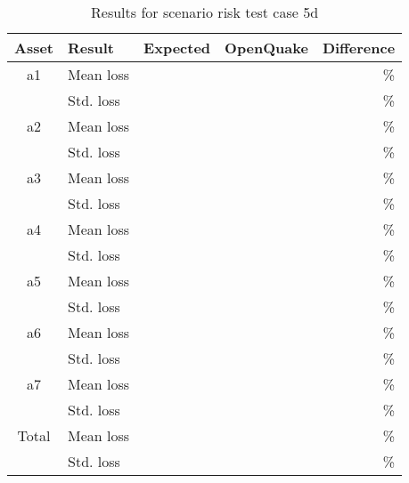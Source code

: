\begin{table}[htbp]

\centering
\begin{tabular}{ c l r r r }

\hline
\rowcolor{anti-flashwhite}
\bf{Asset} & \bf{Result} & \bf{Expected} & \bf{OpenQuake} & \bf{Difference}\\
\hline
a1 & Mean loss &  &  & \% \\
 & Std. loss &  &  & \% \\
\hline
a2 & Mean loss &  &  & \% \\
 & Std. loss &  &  & \% \\
\hline
a3 & Mean loss &  &  & \% \\
 & Std. loss &  &  & \% \\
\hline
a4 & Mean loss &  &  & \% \\
 & Std. loss &  &  & \% \\
\hline
a5 & Mean loss &  &  & \% \\
 & Std. loss &  &  & \% \\
\hline
a6 & Mean loss &  &  & \% \\
 & Std. loss &  &  & \% \\
\hline
a7 & Mean loss &  &  & \% \\
 & Std. loss &  &  & \% \\
\hline
Total & Mean loss &  &  & \% \\
 & Std. loss &  &  & \% \\
\hline
\end{tabular}

\caption{Results for scenario risk test case 5d}
\label{tab:result-scenario-risk-5d}
\end{table}

